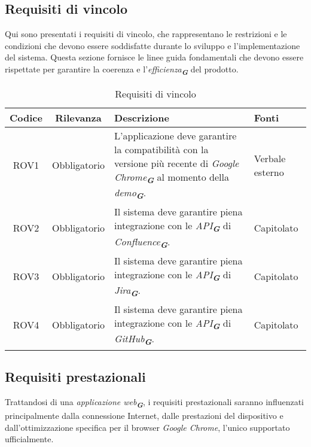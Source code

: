 \subsection{Requisiti di vincolo}
\label{sec:req_vincolo}
Qui sono presentati i requisiti di vincolo, che rappresentano le restrizioni e le condizioni
che devono essere soddisfatte durante lo sviluppo e l'implementazione del sistema. Questa
sezione fornisce le linee guida fondamentali che devono essere rispettate per garantire la
coerenza e l'\emph{efficienza}\textsubscript{\textit{\textbf{G}}} del prodotto.
\begin{table}[h!]
    \centering
    \renewcommand{\arraystretch}{1.6} %
    \begin{tabularx}{\textwidth}{|>{\centering\arraybackslash}c|>{\centering\arraybackslash}c|>{\centering\arraybackslash}X|>{\centering\arraybackslash}p{3cm}|} \hline
    \rowcolor[HTML]{FFD700} 
    \textbf{Codice} & \textbf{Rilevanza} & \textbf{Descrizione} & \textbf{Fonti} \\ \hline
	ROV1 & Obbligatorio & L'applicazione deve garantire la compatibilità con la versione più recente di \emph{Google Chrome}\textsubscript{\textit{\textbf{G}}} al momento della \emph{demo}\textsubscript{\textit{\textbf{G}}}. & Verbale esterno \\ \hline
    ROV2 & Obbligatorio & Il sistema deve garantire piena integrazione con le \emph{API}\textsubscript{\textit{\textbf{G}}} di \emph{Confluence}\textsubscript{\textit{\textbf{G}}}. & Capitolato \\ \hline
    ROV3 & Obbligatorio & Il sistema deve garantire piena integrazione con le \emph{API}\textsubscript{\textit{\textbf{G}}} di \emph{Jira}\textsubscript{\textit{\textbf{G}}}. & Capitolato \\ \hline
    ROV4 & Obbligatorio & Il sistema deve garantire piena integrazione con le \emph{API}\textsubscript{\textit{\textbf{G}}} di \emph{GitHub}\textsubscript{\textit{\textbf{G}}}. & Capitolato \\ \hline
    \end{tabularx}
    \caption{Requisiti di vincolo}
    \label{tab:Requisiti_di_vincolo}
\end{table}

\subsection{Requisiti prestazionali}
\label{sec:req_prestazionali}
Trattandosi di una \emph{applicazione web}\textsubscript{\textit{\textbf{G}}}, i requisiti prestazionali saranno influenzati principalmente dalla connessione Internet, 
dalle prestazioni del dispositivo e dall'ottimizzazione specifica per il browser \emph{Google Chrome}, l'unico supportato ufficialmente.

